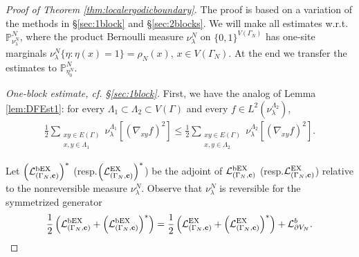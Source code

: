 \documentclass[11pt]{amsart}
\theoremstyle{plain}
\theoremstyle{definition}
\theoremstyle{remark}
\begin{document}
\begin{proof}[Proof of Theorem \ref{thm:localergodicboundary}]
The proof is based on a variation of the methods in \S\ref{sec:1block} and \S\ref{sec:2blocks}. We will make all estimates w.r.t.\@ $\mathbb{P}^N_{\nu^N_\lambda}$, where the product Bernoulli measure $\nu^N_\lambda$ on $\{0,1\}^{V(\Gamma_N)}$ has one-site marginals $\nu^N_\lambda\{\eta: \eta(x)=1\} = \rho_N(x)$, $x\in V(\Gamma_N)$. At the end we transfer the estimates to $\mathbb{P}^N_{\eta_0^N}$.

\emph{One-block estimate, \emph{cf.\@} \S\ref{sec:1block}.} First, we have the analog of Lemma \ref{lem:DFEst1}: for every $\Lambda_1 \subset \Lambda_2 \subset V(\Gamma)$ and every $f\in L^2(\nu_\lambda^{\Lambda_2})$,
\begin{align}
\label{ineq:comp}
\frac{1}{2} \sum_{\substack{xy\in E(\Gamma)\\x,y\in \Lambda_1}}\nu_\lambda^{\Lambda_1}\left[(\nabla_{xy} f)^2 \right] \leq \frac{1}{2} \sum_{\substack{xy\in E(\Gamma)\\x,y\in \Lambda_2}}\nu_\lambda^{\Lambda_2}\left[(\nabla_{xy} f)^2\right].
\end{align}

Let $\left(\mathcal{L}^{\rm bEX}_{(\Gamma_N, {\bf c})}\right)^*$ (resp.\@ $\left(\mathcal{L}^{\rm EX}_{(\Gamma_N, {\bf c})}\right)^*$) be the adjoint of $\mathcal{L}^{\rm bEX}_{(\Gamma_N, {\bf c})}$ (resp.\@ $\mathcal{L}^{\rm EX}_{(\Gamma_N, {\bf c})}$) relative to the nonreversible measure $\nu_\lambda^N$. Observe that $\nu_\lambda^N$ is reversible for the symmetrized generator 
\begin{align*}
\frac{1}{2}\left(\mathcal{L}^{\rm bEX}_{(\Gamma_N,{\bf c})} + \left(\mathcal{L}^{\rm bEX}_{(\Gamma_N,{\bf c})}\right)^*\right) = \frac{1}{2} \left(\mathcal{L}^{\rm EX}_{(\Gamma_N, {\bf c})} + \left(\mathcal{L}^{\rm EX}_{(\Gamma_N, {\bf c})}\right)^*\right) + \mathcal{L}^b_{\partial V_N}.
\end{align*}


\end{proof}
\end{document}
